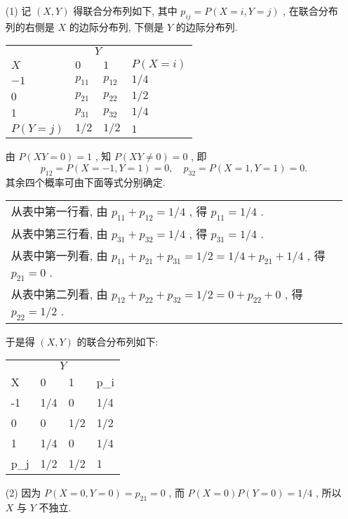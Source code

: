   \begin{solution}
   	\begin{itemize}
   		\item[(1)] 记 $(X,Y)$ 得联合分布列如下, 其中 $p_{ij}=P(X=i,Y=j)$ , 在联合分布列的右侧是 $X$ 的边际分布列, 下侧是 $Y$ 的边际分布列.
   		\begin{center}
   			\begin{tabularx}{0.8\textwidth}{XXXX}
   				\toprule
   				 & \multicolumn{2}{c}{$Y$} & \\
   				\cmidrule{2-3}
   				$X$ & $0$ & $1$ & $P(X=i)$\\
   				\midrule
   				$-1$ & $p_{11}$ & $p_{12}$ & $1/4$\\
   				$0$ & $p_{21}$ & $p_{22}$ & $1/2$\\
   				$1$ & $p_{31}$ & $p_{32}$ & $1/4$\\
   				\midrule
   				$P(Y=j)$ & $1/2$ & $1/2$ & $1$\\
   				\bottomrule
   			\end{tabularx}
   		\end{center}
   		由 $P(XY=0)=1$ , 知 $P(XY\ne0)=0$ , 即
   		\begin{equation*}
   		p_{12}=P(X=-1,Y=1)=0,\quad p_{32}=P(X=1,Y=1)=0.
   		\end{equation*}
   		其余四个概率可由下面等式分别确定.
   		\begin{center}
   			\begin{tabular}{l}
   				从表中第一行看, 由 $p_{11}+p_{12}=1/4$ , 得 $p_{11}=1/4$ .\\
   				从表中第三行看, 由 $p_{31}+p_{32}=1/4$ , 得 $p_{31}=1/4$ .\\
   				从表中第一列看, 由 $p_{11}+p_{21}+p_{31}=1/2=1/4+p_{21}+1/4$ , 得 $p_{21}=0$ .\\
   				从表中第二列看, 由 $p_{12}+p_{22}+p_{32}=1/2=0+p_{22}+0$ , 得 $p_{22}=1/2$ .
   			\end{tabular}
   		\end{center}
   		
   		于是得 $(X,Y)$ 的联合分布列如下:
   		\begin{center}
   			\begin{tabularx}{0.8\textwidth}{YYYY}
   				\toprule
   				 &  & \\
   				X & 0 & 1 & p_{i\cdot}\\
   				 & 1/4 & 0 & 1/4\\
   				0 & 0 & 1/2 & 1/2\\
   				1 & 1/4 & 0 & 1/4\\
   				\midrule
   				p_{\cdot j} & 1/2 & 1/2 & 1\\
   				\bottomrule
   			\end{tabularx}
   		\end{center}
   		\item[(2)] 因为 $P(X=0,Y=0)=p_{21}=0$ , 而 $P(X=0)P(Y=0)=1/4$ , 所以 $X$ 与 $Y$ 不独立.
   	\end{itemize}
   \end{solution}


